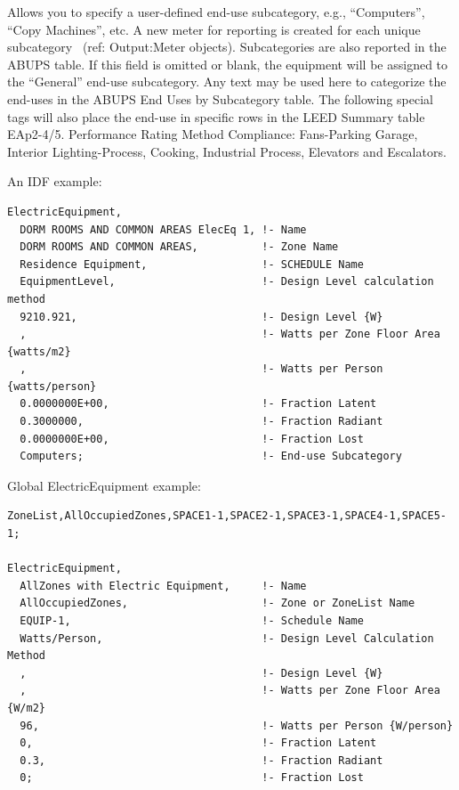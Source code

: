 Allows you to specify a user-defined end-use subcategory, e.g., ``Computers'', ``Copy Machines'', etc. A new meter for reporting is created for each unique subcategory~ (ref: Output:Meter objects). Subcategories are also reported in the ABUPS table. If this field is omitted or blank, the equipment will be assigned to the ``General'' end-use subcategory. Any text may be used here to categorize the end-uses in the ABUPS End Uses by Subcategory table. The following special tags will also place the end-use in specific rows in the LEED Summary table EAp2-4/5. Performance Rating Method Compliance:  Fans-Parking Garage, Interior Lighting-Process, Cooking, Industrial Process, Elevators and Escalators.


An IDF example:

\begin{lstlisting}
ElectricEquipment,
  DORM ROOMS AND COMMON AREAS ElecEq 1, !- Name
  DORM ROOMS AND COMMON AREAS,          !- Zone Name
  Residence Equipment,                  !- SCHEDULE Name
  EquipmentLevel,                       !- Design Level calculation method
  9210.921,                             !- Design Level {W}
  ,                                     !- Watts per Zone Floor Area {watts/m2}
  ,                                     !- Watts per Person {watts/person}
  0.0000000E+00,                        !- Fraction Latent
  0.3000000,                            !- Fraction Radiant
  0.0000000E+00,                        !- Fraction Lost
  Computers;                            !- End-use Subcategory
\end{lstlisting}

Global ElectricEquipment example:

\begin{lstlisting}
ZoneList,AllOccupiedZones,SPACE1-1,SPACE2-1,SPACE3-1,SPACE4-1,SPACE5-1;

ElectricEquipment,
  AllZones with Electric Equipment,     !- Name
  AllOccupiedZones,                     !- Zone or ZoneList Name
  EQUIP-1,                              !- Schedule Name
  Watts/Person,                         !- Design Level Calculation Method
  ,                                     !- Design Level {W}
  ,                                     !- Watts per Zone Floor Area {W/m2}
  96,                                   !- Watts per Person {W/person}
  0,                                    !- Fraction Latent
  0.3,                                  !- Fraction Radiant
  0;                                    !- Fraction Lost
\end{lstlisting}

